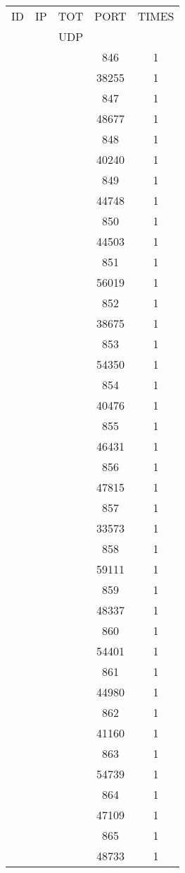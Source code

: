\documentclass[a4paper]{scrartcl}
\begin{document}
\begin{minipage}[b]{0.5\linewidth}
\begin{tabular}{| c | c | c | c | c |}
\hline
ID & IP & TOT & PORT & TIMES \\ 
   &    & UDP &      &       \\ 
\hline
& & & 846 & 1 \\ & & & 38255 & 1 \\ & & & 847 & 1 \\ & & & 48677 & 1 \\ & & & 848 & 1 \\ & & & 40240 & 1 \\ & & & 849 & 1 \\ & & & 44748 & 1 \\ & & & 850 & 1 \\ & & & 44503 & 1 \\ & & & 851 & 1 \\ & & & 56019 & 1 \\ & & & 852 & 1 \\ & & & 38675 & 1 \\ & & & 853 & 1 \\ & & & 54350 & 1 \\ & & & 854 & 1 \\ & & & 40476 & 1 \\ & & & 855 & 1 \\ & & & 46431 & 1 \\ & & & 856 & 1 \\ & & & 47815 & 1 \\ & & & 857 & 1 \\ & & & 33573 & 1 \\ & & & 858 & 1 \\ & & & 59111 & 1 \\ & & & 859 & 1 \\ & & & 48337 & 1 \\ & & & 860 & 1 \\ & & & 54401 & 1 \\ & & & 861 & 1 \\ & & & 44980 & 1 \\ & & & 862 & 1 \\ & & & 41160 & 1 \\ & & & 863 & 1 \\ & & & 54739 & 1 \\ & & & 864 & 1 \\ & & & 47109 & 1 \\ & & & 865 & 1 \\ & & & 48733 & 1 \\ \hline\end{tabular}\end{minipage} \hfill\begin{minipage}[b]{0.5\linewidth}\begin{tabular}{| c | c | c | c | c |}

\end{tabular}
\end{minipage}
\end{document}
